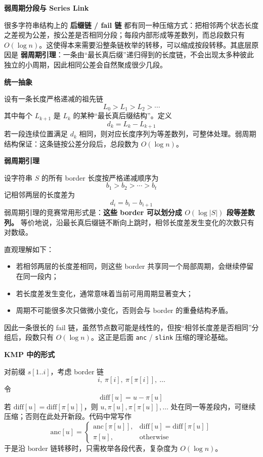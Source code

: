 \textbf{弱周期分段与 Series Link}

很多字符串结构上的 \textbf{后缀链 / fail 链} 都有同一种压缩方式：把相邻两个状态长度之差视为公差，按公差是否相同分段；每段内部形成等差数列，而总段数只有 $O(\log n)$。这使得本来需要沿整条链枚举的转移，可以缩成按段转移。其底层原因是 \textbf{弱周期引理}：一条由“最长真后缀”递归得到的长度链，不会出现太多种彼此独立的小周期，因此相同公差会自然聚成很少几段。

\textbf{统一抽象}

设有一条长度严格递减的祖先链
\[
L_0 > L_1 > L_2 > \cdots
\]
其中每个 $L_{k+1}$ 是 $L_k$ 的某种“最长真后缀结构”。定义
\[
d_k = L_k - L_{k+1}
\]
若一段连续位置满足 $d_k$ 相同，则对应长度序列为等差数列，可整体处理。弱周期结构保证：这条链按公差分段后，总段数为 $O(\log n)$。

\textbf{弱周期引理}

设字符串 $S$ 的所有 border 长度按严格递减顺序为
\[
b_1 > b_2 > \cdots > b_t
\]
记相邻两层的长度差为
\[
d_i = b_i - b_{i+1}
\]
弱周期引理的竞赛常用形式是：\textbf{这些 border 可以划分成 $O(\log |S|)$ 段等差数列。} 等价地说，沿最长真后缀链不断向上跳时，相邻长度差发生变化的次数只有对数级。

直观理解如下：
\begin{itemize}
    \item 若相邻两层的长度差相同，则这些 border 共享同一个局部周期，会继续停留在同一段内；
    \item 若长度差发生变化，通常意味着当前可用周期显著变大；
    \item 周期不可能很多次只做微小变化，否则会与 border 的重叠结构矛盾。
\end{itemize}

因此一条很长的 fail 链，虽然节点数可能是线性的，但按“相邻长度差是否相同”分组后，段数只有 $O(\log n)$。这正是后面 \texttt{anc} / \texttt{slink} 压缩的理论基础。

\textbf{KMP 中的形式}

对前缀 $s[1..i]$，考虑 border 链
\[
i,\ \pi[i],\ \pi[\pi[i]],\ \dots
\]
令
\[
\text{diff}[u] = u - \pi[u]
\]
若 $\text{diff}[u] = \text{diff}[\pi[u]]$，则 $u,\pi[u],\pi[\pi[u]],\dots$ 处在同一等差段内，可继续压缩；否则在此处开新段。代码中常写作
\[
\text{anc}[u] =
\begin{cases}
\text{anc}[\pi[u]], & \text{diff}[u] = \text{diff}[\pi[u]] \\
\pi[u], & \text{otherwise}
\end{cases}
\]
于是沿 border 链转移时，只需枚举各段代表，复杂度为 $O(\log n)$。

